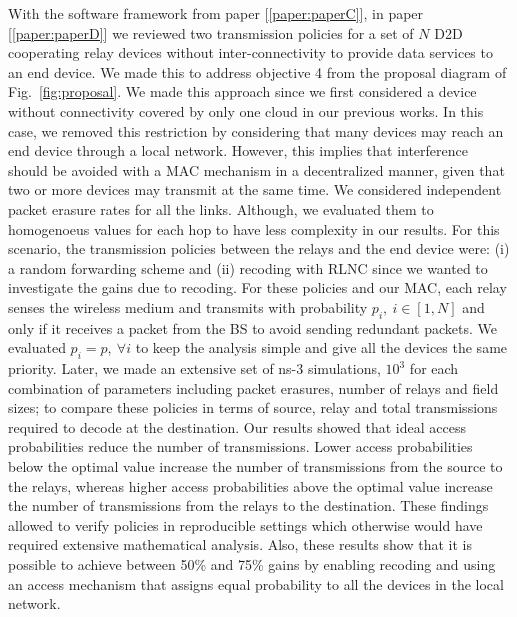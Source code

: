 With the software framework from paper {[\ref{paper:paperC}]}, in paper {[\ref{paper:paperD}]} we reviewed two transmission policies for a set of $N$ \ac{D2D} cooperating relay devices without inter-connectivity to provide data services to an end device. We made this to address objective 4 from the proposal diagram of Fig.~\ref{fig:proposal}. We made this approach since we first considered a device without connectivity covered by only one cloud in our previous works. In this case, we removed this restriction by considering that many devices may reach an end device through a local network. However, this implies that interference should be avoided with a \ac{MAC} mechanism in a decentralized manner, given that two or more devices may transmit at the same time. We considered independent packet erasure rates for all the links. Although, we evaluated them to homogenoeus values for each hop to have less complexity in our results. For this scenario, the transmission policies between the relays and the end device were: (i) a random forwarding scheme and (ii) recoding with \ac{RLNC} since we wanted to investigate the gains due to recoding. For these policies and our \ac{MAC}, each relay senses the wireless medium and transmits with probability $p_i,\ i \in [1,N]$ and only if it receives a packet from the \ac{BS} to avoid sending redundant packets. We evaluated $p_i = p,\ \forall i$ to keep the analysis simple and give all the devices the same priority. Later, we made an extensive set of ns-3 simulations, $10^3$ for each combination of parameters including packet erasures, number of relays and field sizes; to compare these policies in terms of source, relay and total transmissions required to decode at the destination. Our results showed that ideal access probabilities reduce the number of transmissions. Lower access probabilities below the optimal value increase the number of transmissions from the source to the relays, whereas higher access probabilities above the optimal value increase the number of transmissions from the relays to the destination. These findings allowed to verify policies in reproducible settings which otherwise would have required extensive mathematical analysis. Also, these results show that it is possible to achieve between 50\% and 75\% gains by enabling recoding and using an access mechanism that assigns equal probability to all the devices in the local network.

\clearpage